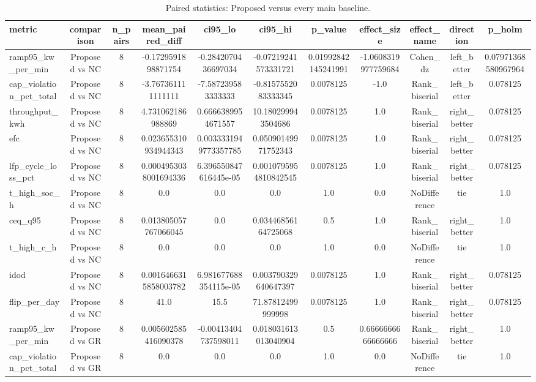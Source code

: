 \begin{table}[t]
\centering
\caption{Paired statistics: Proposed versus every main baseline.}
\label{tab:stats_all_auto}
\begin{tabular}{lcccccccccc}
\toprule
metric & comparison & n\_pairs & mean\_paired\_diff & ci95\_lo & ci95\_hi & p\_value & effect\_size & effect\_name & direction & p\_holm \\
\midrule
ramp95\_kw\_per\_min & Proposed vs NC & 8 & -0.1729591898871754 & -0.2842070436697034 & -0.07219241573331721 & 0.01992842145241991 & -1.0608319977759684 & Cohen\_dz & left\_better & 0.07971368580967964 \\
cap\_violation\_pct\_total & Proposed vs NC & 8 & -3.767361111111111 & -7.587239583333333 & -0.8157552083333345 & 0.0078125 & -1.0 & Rank\_biserial & left\_better & 0.078125 \\
throughput\_kwh & Proposed vs NC & 8 & 4.731062186988869 & 0.6666389954671557 & 10.180299943504686 & 0.0078125 & 1.0 & Rank\_biserial & right\_better & 0.078125 \\
efc & Proposed vs NC & 8 & 0.023655310934944343 & 0.0033331949773357785 & 0.05090149971752343 & 0.0078125 & 1.0 & Rank\_biserial & right\_better & 0.078125 \\
lfp\_cycle\_loss\_pct & Proposed vs NC & 8 & 0.0004953038001694336 & 6.396550847616445e-05 & 0.0010795954810842545 & 0.0078125 & 1.0 & Rank\_biserial & right\_better & 0.078125 \\
t\_high\_soc\_h & Proposed vs NC & 8 & 0.0 & 0.0 & 0.0 & 1.0 & 0.0 & NoDifference & tie & 1.0 \\
ceq\_q95 & Proposed vs NC & 8 & 0.013805057767066045 & 0.0 & 0.03446856164725068 & 0.5 & 1.0 & Rank\_biserial & right\_better & 1.0 \\
t\_high\_c\_h & Proposed vs NC & 8 & 0.0 & 0.0 & 0.0 & 1.0 & 0.0 & NoDifference & tie & 1.0 \\
idod & Proposed vs NC & 8 & 0.0016466315858003782 & 6.981677688354115e-05 & 0.003790329640647397 & 0.0078125 & 1.0 & Rank\_biserial & right\_better & 0.078125 \\
flip\_per\_day & Proposed vs NC & 8 & 41.0 & 15.5 & 71.87812499999998 & 0.0078125 & 1.0 & Rank\_biserial & right\_better & 0.078125 \\
ramp95\_kw\_per\_min & Proposed vs GR & 8 & 0.005602585416090378 & -0.00413404737598011 & 0.018031613013040904 & 0.5 & 0.6666666666666666 & Rank\_biserial & right\_better & 1.0 \\
cap\_violation\_pct\_total & Proposed vs GR & 8 & 0.0 & 0.0 & 0.0 & 1.0 & 0.0 & NoDifference & tie & 1.0 \\

\end{tabular}
\end{table}

